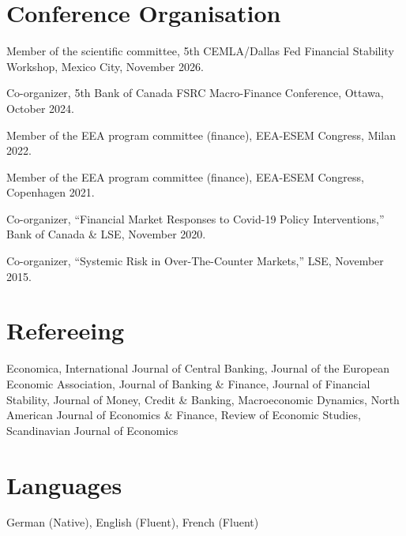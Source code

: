 \documentclass[margin,line, 11pt]{res}
\newenvironment{list1}{
  \begin{list}{\ding{113}}{%
      \setlength{\itemsep}{0in}
      \setlength{\parsep}{0in} \setlength{\parskip}{0in}
      \setlength{\topsep}{0in} \setlength{\partopsep}{0in} 
      \setlength{\leftmargin}{0.17in}}}{\end{list}}
\begin{document}
\begin{resume}
\section{\sc Conference Organisation} 
\begin{list1}
\item[] Member of the scientific committee, 5th CEMLA/Dallas Fed Financial Stability Workshop, Mexico City, November 2026.
\item[] Co-organizer, 5th Bank of Canada FSRC Macro-Finance Conference, Ottawa, October 2024.
\item[] Member of the EEA program committee (finance), EEA-ESEM Congress, Milan 2022.
\item[] Member of the EEA program committee (finance), EEA-ESEM Congress, Copenhagen 2021.
\item[] Co-organizer, ``Financial Market Responses to Covid-19 Policy Interventions,'' Bank of Canada \& LSE, November 2020.
\item[] Co-organizer, ``Systemic Risk in Over-The-Counter Markets,'' LSE, November 2015.
\end{list1}

\section{\sc Refereeing}
\begin{list1}
\item[] Economica, International Journal of Central Banking, Journal of the European Economic Association, Journal of Banking \& Finance, Journal of Financial Stability, Journal of Money, Credit \& Banking, Macroeconomic Dynamics, North American Journal of Economics \& Finance, Review of Economic Studies, Scandinavian Journal of Economics
\end{list1}

\section{\sc Languages}
\begin{list1}
\item[] German (Native), English (Fluent), French (Fluent)
\end{list1}


\end{resume}
\end{document}
